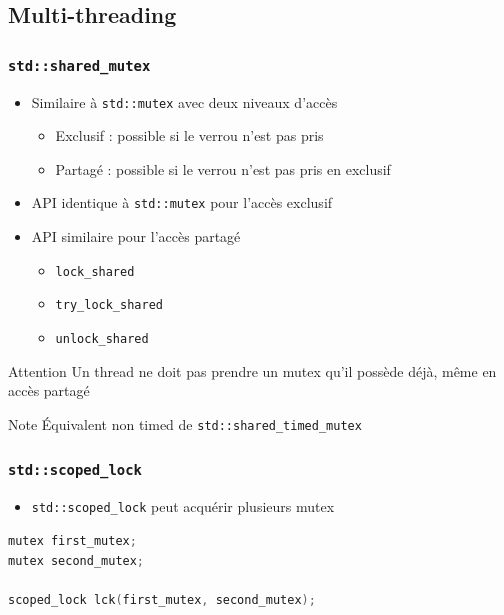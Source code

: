 \documentclass[C++.tex]{subfiles}
\begin{document}
\subsection*{Multi-threading}
\begin{frame}[fragile]
	\frametitle{\lstinline|std::shared_mutex|}
	\begin{itemize}
		\item Similaire à \lstinline|std::mutex| avec deux niveaux d'accès
		\begin{itemize}
			\item Exclusif : possible si le verrou n'est pas pris
			\item Partagé : possible si le verrou n'est pas pris en exclusif
		\end{itemize}
		\item API identique à \lstinline|std::mutex| pour l'accès exclusif
		\item API similaire pour l'accès partagé
		\begin{itemize}
			\item \lstinline|lock_shared|
			\item \lstinline|try_lock_shared|
			\item \lstinline|unlock_shared|
		\end{itemize}
	\end{itemize}

	\begin{alertblock}{Attention}
		Un thread ne doit pas prendre un mutex qu'il possède déjà, même en accès partagé
	\end{alertblock}

	\begin{block}{Note}
		Équivalent non \og timed\fg{} de \lstinline|std::shared_timed_mutex|
	\end{block}
\end{frame}

\begin{frame}[fragile]
	\frametitle{\lstinline|std::scoped_lock|}
	\begin{itemize}
		\item \lstinline|std::scoped_lock| peut acquérir plusieurs mutex
	\end{itemize}

	\begin{lstlisting}[language=C++]
mutex first_mutex;
mutex second_mutex;

scoped_lock lck(first_mutex, second_mutex);\end{lstlisting}
\end{frame}
\end{document}
